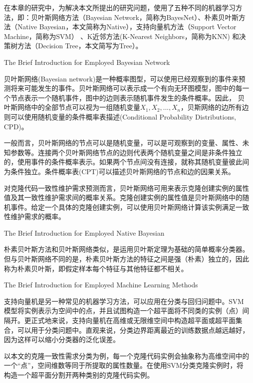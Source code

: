 在本章的研究中，为解决本文所提出的研究问题，使用了五种不同的机器学习方法，即：贝叶斯网络方法（Bayesian Network，简称为BayesNet）\cite{friedman1997bayesian}、朴素贝叶斯方法（Native Bayesian，本文简称为Native）\cite{john1995estimating}，支持向量机方法（Support Vector Machine，简称为SVM）\cite{platt199912} 、K近邻方法(K-Nearest Neighbors，简称为KNN) \cite{aha1991instance}和决策树方法（Decision Tree，本文简写为Tree）\cite{quinlan2014c4}。

{The Brief Introduction for Employed Bayesian Network}

贝叶斯网络(Bayesian network)是一种概率图型，可以使用已经观察到的事件来预测将来可能发生的事件\cite{friedman1997bayesian}。贝叶斯网络可以表示成一个有向无环图模型，图中的每一个节点表示一个随机事件，图中的边则表示随机事件发生的条件概率。因此， 贝叶斯网络中的全部节点可以视为一组随机变量{$X_{1},X_{2},...,X_{n}$}，贝斯网络的边所有边则可以使用随机变量的条件概率表描述(Conditional Probability Distributions, CPD)。

一般而言，贝叶斯网络的节点可以是随机变量，可以是可观察到的变量、属性、未知参数等。连接两个贝叶斯网络节点的边则代表两个随机变量之间是非条件独立的，使用事件的条件概率表示。如果两个节点间没有连接，就称其随机变量彼此间为条件独立。条件概率表(CPT)可以描述贝叶斯网络的节点和边的因果关系。

对克隆代码一致性维护需求预测而言，贝叶斯网络可用来表示克隆创建实例的属性值及其一致性维护需求间的概率关系。克隆创建实例的属性值是贝叶斯网络中的随机事件。给定一个具体的克隆创建实例，可以使用贝叶斯网络计算该实例满足一致性维护需求的概率。

{The Brief Introduction for Employed Native Bayesian}

朴素贝叶斯方法和贝叶斯网络类似，是运用贝叶斯定理为基础的简单概率分类器。但与贝叶斯网络不同的是，朴素贝叶斯方法的特征之间是强（朴素）独立的，因此称为朴素贝叶斯，即假定样本每个特征与其他特征都不相关。 

{The Brief Introduction for Employed Machine Learning Methods}

支持向量机是另一种常见的机器学习方法，可以应用在分类与回归问题中。SVM模型将实例表示为空间中的点，并且试图构造一个超平面将不同类的实例（点）间隔开。更正式地来说，支持向量机在高维或无限维空间中构造超平面或超平面集合，可以用于分类问题中。直观来说，分类边界距离最近的训练数据点越远越好，因为这样可以缩小分类器的泛化误差。

以本文的克隆一致性需求分类为例，每一个克隆代码实例会抽象称为高维空间中的一个“点”，空间维数等同于所提取的属性数量。在使用SVM分类克隆实例时，将构造一个超平面分割开两种类别的克隆代码实例。

